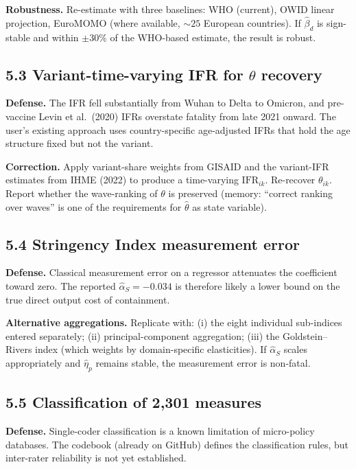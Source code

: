\documentclass[11pt,a4paper]{article}
\begin{document}
\textbf{Robustness.} Re-estimate with three baselines: WHO (current), OWID linear projection, EuroMOMO (where available, $\sim 25$ European countries). If $\hat\beta_d$ is sign-stable and within $\pm 30\%$ of the WHO-based estimate, the result is robust.

\subsection*{5.3 Variant-time-varying IFR for $\theta$ recovery}

\textbf{Defense.} The IFR fell substantially from Wuhan to Delta to Omicron, and pre-vaccine Levin et al.\ (2020) IFRs overstate fatality from late 2021 onward. The user's existing approach uses country-specific age-adjusted IFRs that hold the age structure fixed but not the variant.

\textbf{Correction.} Apply variant-share weights from GISAID and the variant-IFR estimates from IHME (2022) to produce a time-varying $\text{IFR}_{ik}$. Re-recover $\theta_{ik}$. Report whether the wave-ranking of $\theta$ is preserved (memory: ``correct ranking over waves'' is one of the requirements for $\hat\theta$ as state variable).

\subsection*{5.4 Stringency Index measurement error}

\textbf{Defense.} Classical measurement error on a regressor attenuates the coefficient toward zero. The reported $\hat\alpha_S = -0.034$ is therefore likely a lower bound on the true direct output cost of containment.

\textbf{Alternative aggregations.} Replicate with: (i) the eight individual sub-indices entered separately; (ii) principal-component aggregation; (iii) the Goldstein--Rivers index (which weights by domain-specific elasticities). If $\hat\alpha_S$ scales appropriately and $\hat\eta_p$ remains stable, the measurement error is non-fatal.

\subsection*{5.5 Classification of 2{,}301 measures}

\textbf{Defense.} Single-coder classification is a known limitation of micro-policy databases. The codebook (already on GitHub) defines the classification rules, but inter-rater reliability is not yet established.
\end{document}
